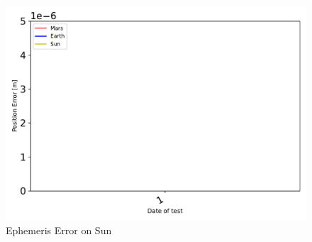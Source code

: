 \begin{figure}[htbp]\centerline{\includegraphics[height=0.7\textwidth, keepaspectratio]{AutoTeX/EphemSun}}\caption{Ephemeris Error on Sun}\label{fig:EphemSun}\end{figure}